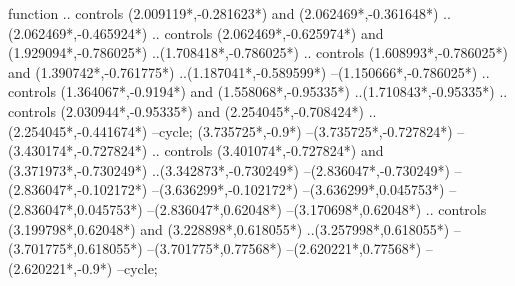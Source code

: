{\begin{scope}[x=1mm,y=1mm,line width=\SCstroke mm,line cap=round,line join=round]
\begin{SCpart}{function}
.. controls ({2.009119*\SCF},{-0.281623*\SCF}) and ({2.062469*\SCF},{-0.361648*\SCF}) ..({2.062469*\SCF},{-0.465924*\SCF})
.. controls ({2.062469*\SCF},{-0.625974*\SCF}) and ({1.929094*\SCF},{-0.786025*\SCF}) ..({1.708418*\SCF},{-0.786025*\SCF})
.. controls ({1.608993*\SCF},{-0.786025*\SCF}) and ({1.390742*\SCF},{-0.761775*\SCF}) ..({1.187041*\SCF},{-0.589599*\SCF})
--({1.150666*\SCF},{-0.786025*\SCF})
.. controls ({1.364067*\SCF},{-0.9194*\SCF}) and ({1.558068*\SCF},{-0.95335*\SCF}) ..({1.710843*\SCF},{-0.95335*\SCF})
.. controls ({2.030944*\SCF},{-0.95335*\SCF}) and ({2.254045*\SCF},{-0.708424*\SCF}) ..({2.254045*\SCF},{-0.441674*\SCF})
--cycle;
 ({3.735725*\SCF},{-0.9*\SCF})
--({3.735725*\SCF},{-0.727824*\SCF})
--({3.430174*\SCF},{-0.727824*\SCF})
.. controls ({3.401074*\SCF},{-0.727824*\SCF}) and ({3.371973*\SCF},{-0.730249*\SCF}) ..({3.342873*\SCF},{-0.730249*\SCF})
--({2.836047*\SCF},{-0.730249*\SCF})
--({2.836047*\SCF},{-0.102172*\SCF})
--({3.636299*\SCF},{-0.102172*\SCF})
--({3.636299*\SCF},{0.045753*\SCF})
--({2.836047*\SCF},{0.045753*\SCF})
--({2.836047*\SCF},{0.62048*\SCF})
--({3.170698*\SCF},{0.62048*\SCF})
.. controls ({3.199798*\SCF},{0.62048*\SCF}) and ({3.228898*\SCF},{0.618055*\SCF}) ..({3.257998*\SCF},{0.618055*\SCF})
--({3.701775*\SCF},{0.618055*\SCF})
--({3.701775*\SCF},{0.77568*\SCF})
--({2.620221*\SCF},{0.77568*\SCF})
--({2.620221*\SCF},{-0.9*\SCF})
--cycle;
\end{SCpart}
\end{scope}
}
